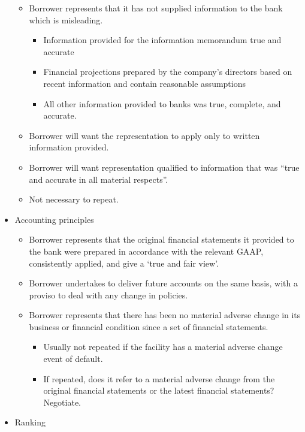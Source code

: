 \documentclass[
]{article}
\providecommand{\tightlist}{%
  \setlength{\itemsep}{0pt}\setlength{\parskip}{0pt}}
\begin{document}
\begin{itemize}
  \begin{itemize}
  \tightlist
  \item
    Borrower represents that it has not supplied information to the bank
    which is misleading.

    \begin{itemize}
    \tightlist
    \item
      Information provided for the information memorandum true and
      accurate
    \item
      Financial projections prepared by the company's directors based on
      recent information and contain reasonable assumptions
    \item
      All other information provided to banks was true, complete, and
      accurate.
    \end{itemize}
  \item
    Borrower will want the representation to apply only to written
    information provided.
  \item
    Borrower will want representation qualified to information that was
    ``true and accurate in all material respects''.
  \item
    Not necessary to repeat.
  \end{itemize}
\item
  Accounting principles

  \begin{itemize}
  \tightlist
  \item
    Borrower represents that the original financial statements it
    provided to the bank were prepared in accordance with the relevant
    GAAP, consistently applied, and give a `true and fair view'.
  \item
    Borrower undertakes to deliver future accounts on the same basis,
    with a proviso to deal with any change in policies.
  \item
    Borrower represents that there has been no material adverse change
    in its business or financial condition since a set of financial
    statements.

    \begin{itemize}
    \tightlist
    \item
      Usually not repeated if the facility has a material adverse change
      event of default.
    \item
      If repeated, does it refer to a material adverse change from the
      original financial statements or the latest financial statements?
      Negotiate.
    \end{itemize}
  \end{itemize}
\item
  Ranking


\end{itemize}
\end{document}
